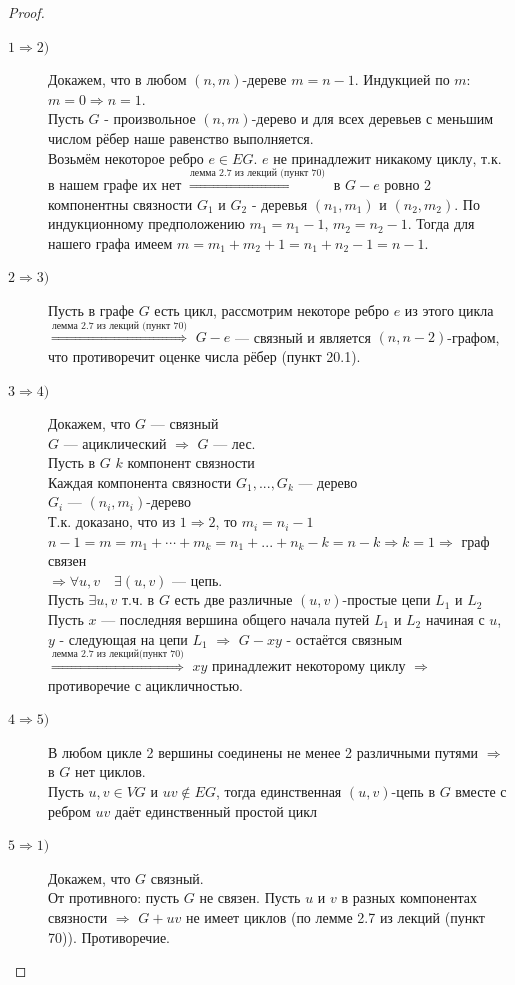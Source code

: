 \documentclass[12pt]{article}
\begin{document}
	\begin{proof}\hfil
		\begin{description}
			\item[$1  \Rightarrow 2)$] Докажем, что в любом $(n,m)$-дереве $m=n-1$. Индукцией по $m$:\\
				$m=0 \Rightarrow n=1$.\\
				Пусть $G$ - произвольное $(n,m)$-дерево и для всех деревьев с меньшим числом рёбер наше равенство выполняется.\\
				Возьмём некоторое ребро $e \in EG$. $e$ не принадлежит никакому циклу, т.к. в нашем графе их нет $\overset{\text{лемма 2.7 из лекций (пункт 70)}}{\Rightarrow}$ в $G-e$ ровно 2 компонентны
				связности $G_1$ и $G_2$ - деревья $(n_1,m_1)$ и $(n_2,m_2)$. По индукционному предположению $m_1 = n_1-1, \, m_2=n_2-1$. Тогда для нашего графа имеем
				$m=m_1+m_2+1=n_1+n_2-1=n-1$.
			\item[$2  \Rightarrow 3)$] Пусть в графе $G$ есть цикл, рассмотрим некоторе ребро $e$ из этого цикла $\overset{\text{лемма 2.7 из лекций (пункт 70)}}{\Rightarrow} $  $G-e$ — связный и является $(n,n-2)$-графом, что противоречит оценке числа рёбер (пункт 20.1).
			\item[$3  \Rightarrow 4)$] Докажем, что $G$ — связный\\
			$G$ — ациклический $\Rightarrow$ $G$ — лес.\\
			Пусть в $G$ $k$ компонент связности\\
			Каждая компонента связности $G_1,...,G_k$ — дерево\\
			$G_i$ — $(n_i,m_i)$-дерево\\
			Т.к. доказано, что из
				$1 \Rightarrow 2$, то $m_i=n_i - 1$\\
				$n-1 = m = m_1+\dotsb+m_k = n_1+...+n_k-k=n-k \Rightarrow k=1 \Rightarrow $ граф связен\\
				$ \Rightarrow \forall u,v \quad \exists (u,v)$ — цепь.\\
				Пусть $\exists u,v$ т.ч. в $G$ есть две различные $(u,v)$-простые цепи $L_1$ и $L_2$\\
				Пусть $x$ — последняя вершина общего начала путей $L_1$ и $L_2$
				начиная с $u$, $y$ - следующая на цепи $L_1$ $ \Rightarrow $ $G-xy$ - остаётся связным $\overset{\text{лемма 2.7 из лекций(пункт 70)}}{ \Rightarrow }$ $xy$ принадлежит
				некоторому циклу $ \Rightarrow $ противоречие с ацикличностью.
			\item[$4  \Rightarrow 5)$] В любом цикле 2 вершины соединены не менее 2 различными путями $ \Rightarrow $ в $G$ нет циклов.\\
			Пусть $u,v \in VG$ и $uv \not\in EG$, тогда единственная $(u,v)$-цепь в $G$ вместе с ребром $uv$ даёт единственный простой цикл
			\item[$5  \Rightarrow 1)$] Докажем, что $G$ связный.\\
			От противного: пусть $G$ не связен. Пусть $u$ и $v$ в разных компонентах связности $ \Rightarrow $
				$G + uv$ не имеет циклов (по лемме 2.7 из лекций (пункт 70)). Противоречие.
		\end{description}
	\end{proof}
\end{document}
